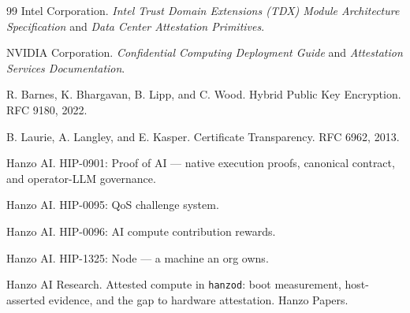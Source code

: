 \documentclass[11pt]{article}
\newcommand{\code}[1]{\texttt{#1}}
\begin{document}
\begin{thebibliography}{99}
Intel Corporation.
\newblock \emph{Intel Trust Domain Extensions (TDX) Module Architecture Specification} and
\emph{Data Center Attestation Primitives}.

NVIDIA Corporation.
\newblock \emph{Confidential Computing Deployment Guide} and \emph{Attestation Services
Documentation}.

R. Barnes, K. Bhargavan, B. Lipp, and C. Wood.
\newblock Hybrid Public Key Encryption.
\newblock RFC 9180, 2022.

B. Laurie, A. Langley, and E. Kasper.
\newblock Certificate Transparency.
\newblock RFC 6962, 2013.

Hanzo AI.
\newblock HIP-0901: Proof of AI --- native execution proofs, canonical contract, and operator-LLM
governance.

Hanzo AI.
\newblock HIP-0095: QoS challenge system.

Hanzo AI.
\newblock HIP-0096: AI compute contribution rewards.

Hanzo AI.
\newblock HIP-1325: Node --- a machine an org owns.

Hanzo AI Research.
\newblock Attested compute in \code{hanzod}: boot measurement, host-asserted evidence, and the gap to
hardware attestation.
\newblock Hanzo Papers.

\end{thebibliography}
\end{document}

